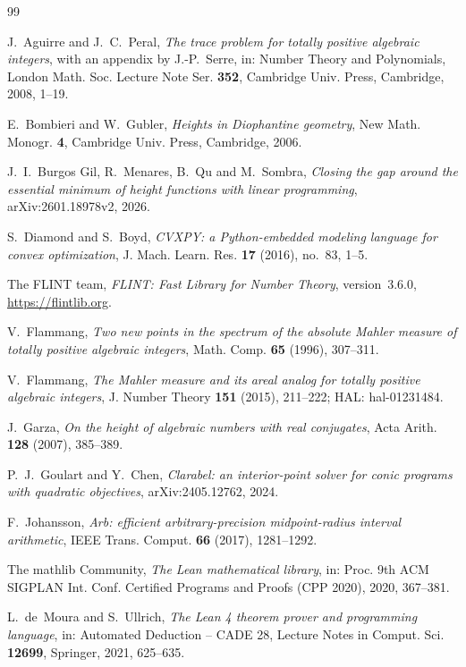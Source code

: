 \documentclass[11pt]{amsart}
\theoremstyle{remark}
\numberwithin{equation}{section}
\begin{document}
\begin{thebibliography}{99}

 J.~Aguirre and J.~C.~Peral, \emph{The trace problem for totally positive algebraic integers}, with an appendix by J.-P.~Serre, in: Number Theory and Polynomials, London Math. Soc. Lecture Note Ser. \textbf{352}, Cambridge Univ. Press, Cambridge, 2008, 1--19.

 E.~Bombieri and W.~Gubler, \emph{Heights in Diophantine geometry}, New Math. Monogr. \textbf{4}, Cambridge Univ. Press, Cambridge, 2006.

 J.~I.~Burgos Gil, R.~Menares, B.~Qu and M.~Sombra, \emph{Closing the gap around the essential minimum of height functions with linear programming}, arXiv:2601.18978v2, 2026.


 S.~Diamond and S.~Boyd, \emph{CVXPY: a Python-embedded modeling language for convex optimization}, J. Mach. Learn. Res. \textbf{17} (2016), no.~83, 1--5.

 The FLINT team, \emph{FLINT: Fast Library for Number Theory}, version~3.6.0, \url{https://flintlib.org}.

 V.~Flammang, \emph{Two new points in the spectrum of the absolute Mahler measure of totally positive algebraic integers}, Math. Comp. \textbf{65} (1996), 307--311.

 V.~Flammang, \emph{The Mahler measure and its areal analog for totally positive algebraic integers}, J. Number Theory \textbf{151} (2015), 211--222; HAL: hal-01231484.

 J.~Garza, \emph{On the height of algebraic numbers with real conjugates}, Acta Arith. \textbf{128} (2007), 385--389.

 P.~J.~Goulart and Y.~Chen, \emph{Clarabel: an interior-point solver for conic programs with quadratic objectives}, arXiv:2405.12762, 2024.

 F.~Johansson, \emph{Arb: efficient arbitrary-precision midpoint-radius interval arithmetic}, IEEE Trans. Comput. \textbf{66} (2017), 1281--1292.

 The mathlib Community, \emph{The Lean mathematical library}, in: Proc. 9th ACM SIGPLAN Int. Conf. Certified Programs and Proofs (CPP 2020), 2020, 367--381.

 L.~de~Moura and S.~Ullrich, \emph{The Lean 4 theorem prover and programming language}, in: Automated Deduction -- CADE 28, Lecture Notes in Comput. Sci. \textbf{12699}, Springer, 2021, 625--635.


\end{thebibliography}
\end{document}
